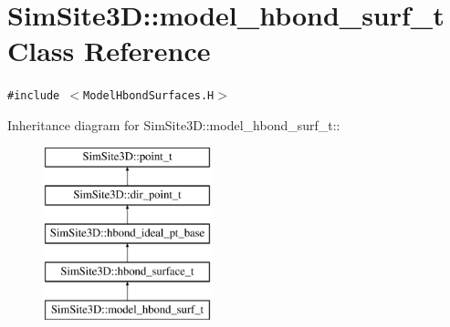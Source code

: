 \section{SimSite3D::model\_\-hbond\_\-surf\_\-t Class Reference}
\label{classSimSite3D_1_1model__hbond__surf__t}
{\tt \#include $<$Model\-Hbond\-Surfaces.H$>$}

Inheritance diagram for SimSite3D::model\_\-hbond\_\-surf\_\-t::\begin{figure}[H]
\begin{center}
\leavevmode
\includegraphics[height=5cm]{classSimSite3D_1_1model__hbond__surf__t}
\end{center}
\end{figure}
